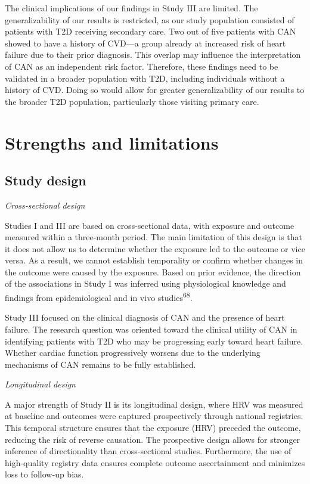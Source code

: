 \documentclass[
  a4paper,
  headsepline=true,
  open=any]{scrbook}
\begin{document}
The clinical implications of our findings in Study III are limited. The
generalizability of our results is restricted, as our study population
consisted of patients with T2D receiving secondary care. Two out of five
patients with CAN showed to have a history of CVD---a group already at
increased risk of heart failure due to their prior diagnosis. This
overlap may influence the interpretation of CAN as an independent risk
factor. Therefore, these findings need to be validated in a broader
population with T2D, including individuals without a history of CVD.
Doing so would allow for greater generalizability of our results to the
broader T2D population, particularly those visiting primary care.

\hypertarget{strengths-and-limitations}{%
\section{Strengths and limitations}\label{strengths-and-limitations}}

\hypertarget{study-design}{%
\subsection{Study design}\label{study-design}}

\emph{Cross-sectional design}

Studies I and III are based on cross-sectional data, with exposure and
outcome measured within a three-month period. The main limitation of
this design is that it does not allow us to determine whether the
exposure led to the outcome or vice versa. As a result, we cannot
establish temporality or confirm whether changes in the outcome were
caused by the exposure. Based on prior evidence, the direction of the
associations in Study I was inferred using physiological knowledge and
findings from epidemiological and in vivo studies\textsuperscript{68}.

Study III focused on the clinical diagnosis of CAN and the presence of
heart failure. The research question was oriented toward the clinical
utility of CAN in identifying patients with T2D who may be progressing
early toward heart failure. Whether cardiac function progressively
worsens due to the underlying mechanisms of CAN remains to be fully
established.

\emph{Longitudinal design}

A major strength of Study II is its longitudinal design, where HRV was
measured at baseline and outcomes were captured prospectively through
national registries. This temporal structure ensures that the exposure
(HRV) preceded the outcome, reducing the risk of reverse causation. The
prospective design allows for stronger inference of directionality than
cross-sectional studies. Furthermore, the use of high-quality registry
data ensures complete outcome ascertainment and minimizes loss to
follow-up bias.
\end{document}
